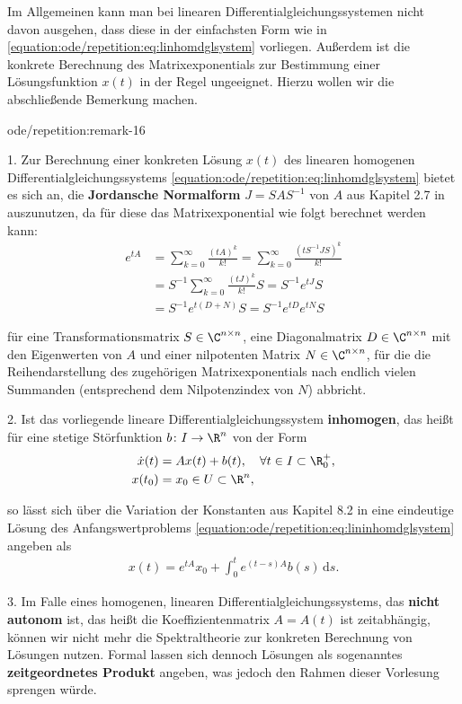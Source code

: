 \documentclass[letterpaper,10pt,german]{jupyterBook}
\begin{document}
\par
Im Allgemeinen kann man bei linearen Differentialgleichungssystemen nicht davon ausgehen, dass diese in der einfachsten Form wie in \eqref{equation:ode/repetition:eq:linhomdglsystem} vorliegen.
Außerdem ist die konkrete Berechnung des Matrixexponentials zur Bestimmung einer Lösungsfunktion \(x(t)\) in der Regel ungeeignet.
Hierzu wollen wir die abschließende Bemerkung machen.
\begin{remark}{}{ode/repetition:remark-16}



\par
1. Zur Berechnung einer konkreten Lösung \(x(t)\) des linearen homogenen Differentialgleichungssystems \eqref{equation:ode/repetition:eq:linhomdglsystem} bietet es sich an, die \textbf{Jordansche Normalform} \(J = SAS^{-1}\) von \(A\) aus Kapitel 2.7 in \cite{Ten21} auszunutzen, da für diese das Matrixexponential wie folgt berechnet werden kann:
\begin{align*}
e^{tA} &=  \sum_{k=0}^\infty \frac{(t A)^k}{k!} = \sum_{k=0}^\infty \frac{(tS^{-1}JS)^k}{k!} 
\\&= 
S^{-1} \sum_{k=0}^\infty \frac{(tJ)^k}{k!} S = S^{-1} e^{tJ}S 
\\&= S^{-1} e^{t(D+N)}S = S^{-1} e^{tD} e^{tN} S
\end{align*}
\par
für eine Transformationsmatrix \(S \in \C^{n \times n}\), eine Diagonalmatrix \(D \in \C^{n \times n}\) mit den Eigenwerten von \(A\) und einer nilpotenten Matrix \(N \in \C^{n \times n}\), für die die Reihendarstellung des zugehörigen Matrixexponentials nach endlich vielen Summanden (entsprechend dem Nilpotenzindex von \(N\)) abbricht.

\par
2. Ist das vorliegende lineare Differentialgleichungssystem \textbf{inhomogen}, das heißt für eine stetige Störfunktion \(b \colon I \rightarrow \R^n\) von der Form
\begin{align}\label{equation:ode/repetition:eq:lininhomdglsystem}
\dot{x}(t) &= A x(t) + b(t), \quad \forall t \in I \subset \R^+_0, \\
x(t_0) &= x_0 \in U \subset \R^n,
\end{align}
\par
so lässt sich über die Variation der Konstanten aus Kapitel 8.2 in \cite{Ten21} eine eindeutige Lösung des Anfangswertproblems \eqref{equation:ode/repetition:eq:lininhomdglsystem} angeben als
\begin{align*}
x(t) = e^{tA}x_0 + \int_0^t e^{(t-s)A}b(s) \, \mathrm{d}s.
\end{align*}
\par
3. Im Falle eines homogenen, linearen Differentialgleichungssystems, das \textbf{nicht autonom} ist, das heißt die Koeffizientenmatrix \(A = A(t)\) ist zeitabhängig, können wir nicht mehr die Spektraltheorie zur konkreten Berechnung von Lösungen nutzen.
Formal lassen sich dennoch Lösungen als sogenanntes \textbf{zeitgeordnetes Produkt} angeben, was jedoch den Rahmen dieser Vorlesung sprengen würde.
\end{remark}
\end{document}
